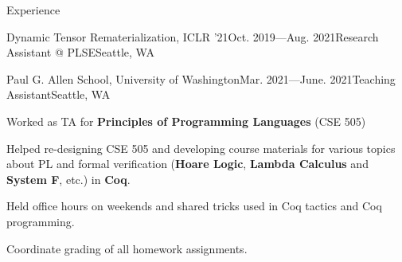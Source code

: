 \documentclass{resume}
\newcommand{\myul}[2][blue]{\setulcolor{#1}\ul{#2}\setulcolor{blue}}
\begin{document}
\begin{rSection}{Experience}
\begin{rSubsection}{Dynamic Tensor Rematerialization, ICLR '21}{Oct. 2019---Aug. 2021}{Research Assistant @ PLSE}{Seattle, WA}
        \end{rSubsection}
        \vspace{-5pt}
		\begin{rSubsection}{Paul G. Allen School, University of Washington}{Mar. 2021---June. 2021}{Teaching Assistant}{Seattle, WA}
			\item Worked as TA for \textbf{Principles of Programming Languages} (CSE 505)
			\item Helped re-designing CSE 505 and developing course materials for various topics about PL and formal verification (\textbf{Hoare Logic}, \textbf{Lambda Calculus} and \textbf{System F}, etc.) in \textbf{Coq}.
			\item Held office hours on weekends and shared tricks used in Coq tactics and Coq programming.
			\item Coordinate grading of all homework assignments.
		\end{rSubsection}
    \end{rSection}
	\vspace{-5pt}


\end{document}
